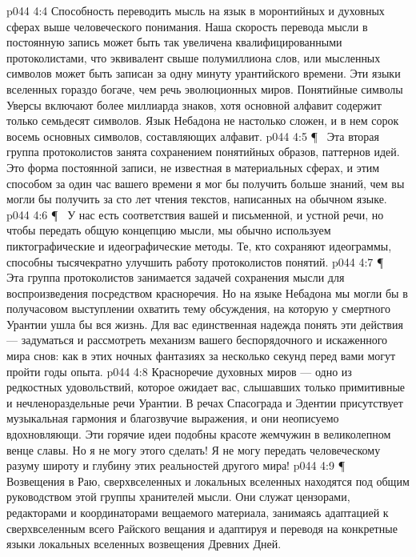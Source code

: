 \vs p044 4:4 Способность переводить мысль на язык в моронтийных и духовных сферах выше человеческого понимания. Наша скорость перевода мысли в постоянную запись может быть так увеличена квалифицированными протоколистами, что эквивалент свыше полумиллиона слов, или мысленных символов может быть записан за одну минуту урантийского времени. Эти языки вселенных гораздо богаче, чем речь эволюционных миров. Понятийные символы Уверсы включают более миллиарда знаков, хотя основной алфавит содержит только семьдесят символов. Язык Небадона не настолько сложен, и в нем сорок восемь основных символов, составляющих алфавит.
\vs p044 4:5 \P\ \bibnobreakspace {} Эта вторая группа протоколистов занята сохранением понятийных образов, паттернов идей. Это форма постоянной записи, не известная в материальных сферах, и этим способом за один час вашего времени я мог бы получить больше знаний, чем вы могли бы получить за сто лет чтения текстов, написанных на обычном языке.
\vs p044 4:6 \P\ \bibnobreakspace {} У нас есть соответствия вашей и письменной, и устной речи, но чтобы передать общую концепцию мысли, мы обычно используем пиктографические и идеографические методы. Те, кто сохраняют идеограммы, способны тысячекратно улучшить работу протоколистов понятий.
\vs p044 4:7 \P\ \bibnobreakspace {} Эта группа протоколистов занимается задачей сохранения мысли для воспроизведения посредством красноречия. Но на языке Небадона мы могли бы в получасовом выступлении охватить тему обсуждения, на которую у смертного Урантии ушла бы вся жизнь. Для вас единственная надежда понять эти действия --- задуматься и рассмотреть механизм вашего беспорядочного и искаженного мира снов: как в этих ночных фантазиях за несколько секунд перед вами могут пройти годы опыта.
\vs p044 4:8 Красноречие духовных миров --- одно из редкостных удовольствий, которое ожидает вас, слышавших только примитивные и нечленораздельные речи Урантии. В речах Спасограда и Эдентии присутствует музыкальная гармония и благозвучие выражения, и они неописуемо вдохновляющи. Эти горячие идеи подобны красоте жемчужин в великолепном венце славы. Но я не могу этого сделать! Я не могу передать человеческому разуму широту и глубину этих реальностей другого мира!
\vs p044 4:9 \P\ \bibnobreakspace {} Возвещения в Раю, сверхвселенных и локальных вселенных находятся под общим руководством этой группы хранителей мысли. Они служат цензорами, редакторами и координаторами вещаемого материала, занимаясь адаптацией к сверхвселенным всего Райского вещания и адаптируя и переводя на конкретные языки локальных вселенных возвещения Древних Дней.
